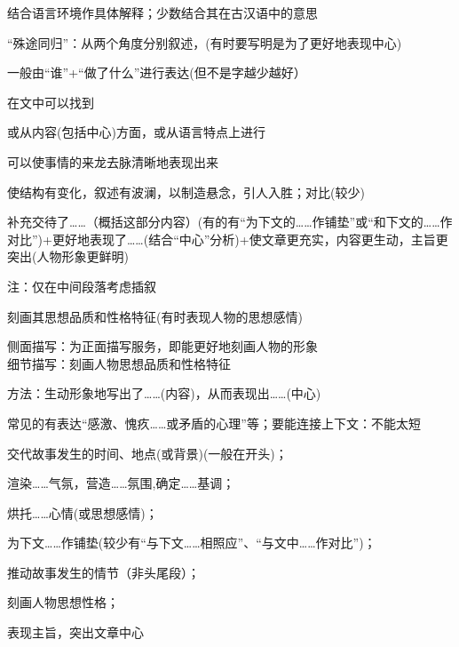结合语言环境作具体解释；少数结合其在古汉语中的意思

``殊途同归''：从两个角度分别叙述，(有时要写明是为了更好地表现中心)

一般由``谁''+``做了什么''进行表达(但不是字越少越好）

在文中可以找到

或从内容(包括中心)方面，或从语言特点上进行

可以使事情的来龙去脉清晰地表现出来

使结构有变化，叙述有波澜，以制造悬念，引人入胜；对比(较少)

补充交待了\ldots{}\ldots{}（概括这部分内容）(有的有``为下文的\ldots{}\ldots{}作铺垫''或``和下文的\ldots{}\ldots{}作对比'')+更好地表现了\ldots{}\ldots{}(结合``中心''分析)+使文章更充实，内容更生动，主旨更突出(人物形象更鲜明)\par
注：仅在中间段落考虑插叙

刻画其思想品质和性格特征(有时表现人物的思想感情)\par
侧面描写：为正面描写服务，即能更好地刻画人物的形象\\
细节描写：刻画人物思想品质和性格特征\par
方法：生动形象地写出了\ldots{}\ldots{}(内容)，从而表现出\ldots{}\ldots{}(中心)

常见的有表达``感激、愧疚\ldots{}\ldots{}或矛盾的心理''等；要能连接上下文：不能太短

\begin{asparaenum}[(1)]
\item 交代故事发生的时间、地点(或背景)(一般在开头)；
\item 渲染\ldots{}\ldots{}气氛，营造\ldots{}\ldots{}氛围,确定\ldots{}\ldots{}基调；
\item 烘托\ldots{}\ldots{}心情(或思想感情)；
\item 为下文\ldots{}\ldots{}作铺垫(较少有``与下文\ldots{}\ldots{}相照应''、``与文中\ldots{}\ldots{}作对比'')；
\item 推动故事发生的情节（非头尾段）；
\item 刻画人物思想性格；
\item 表现主旨，突出文章中心
\end{asparaenum}


